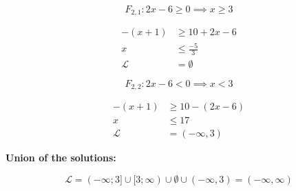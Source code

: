 \[
	F_{2,1}: 2x - 6 \ge 0 \implies x \ge 3
\]

\begin{align*}
	-(x + 1 )   & \ge 10 + 2x - 6  \\
	x           & \le \frac{-5}{3} \\
	\mathcal{L} & = \emptyset
\end{align*}

\[
	F_{2,2}: 2x - 6 < 0 \implies x < 3
\]

\begin{align*}
	-(x + 1 )   & \ge 10 - (2x - 6) \\
	x           & \le 17            \\
	\mathcal{L} & = (- \infty, 3)
\end{align*}

\textbf{Union of the solutions:}

\[
	\mathcal{L} =
	(-\infty; 3] \cup
	[3; \infty ) \cup
	\emptyset    \cup
	(- \infty, 3) = (- \infty, \infty)
\]


